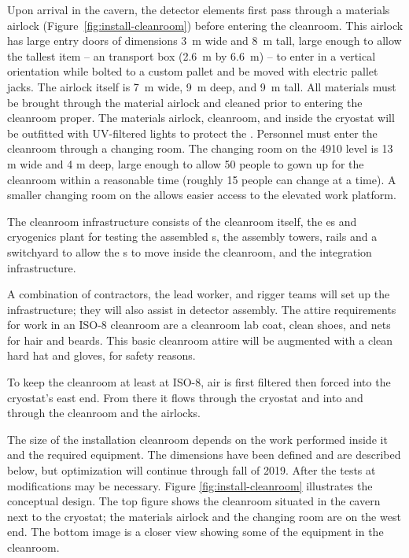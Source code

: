 Upon arrival in the cavern, the detector elements first pass through a materials airlock (Figure~\ref{fig:install-cleanroom}) before entering the cleanroom. This airlock has large entry doors of dimensions \SI{3}{m} wide and \SI{8}{m} tall, large enough to allow the tallest item -- an  transport box (\SI{2.6}{m} by \SI{6.6}{m}) -- to enter in a vertical orientation while bolted to a custom pallet and be moved with electric pallet jacks. 
The airlock itself is \SI{7}{m} wide, \SI{9}{m} deep, and \SI{9}{m} tall. All materials must be brought through the material airlock and cleaned prior to entering the cleanroom proper. 
The materials airlock, cleanroom, and inside the cryostat will be outfitted with UV-filtered lights to protect the . 
Personnel must enter the cleanroom through a changing room. The changing room on the 4910 level is 13 \si{m} wide and 4 \si{m} deep, %
large enough to allow 50 people to gown up for the cleanroom within a reasonable time (roughly 15 people can change at a time). A smaller changing room on the  allows easier access to the elevated work platform.


The cleanroom infrastructure consists of the cleanroom itself, the \coldbox{}es and cryogenics plant for testing the assembled s, the assembly towers, rails and a switchyard to allow the s to move inside the cleanroom, and the  integration infrastructure. 

A combination of contractors, the lead worker, and rigger teams will set up the infrastructure;  they will also assist in detector assembly. 
The attire requirements for work in an ISO-8 cleanroom are a cleanroom lab coat, clean shoes, and nets for hair and beards.  This basic cleanroom attire will be augmented with a clean hard hat and gloves, for safety reasons. 

To keep the cleanroom at least at ISO-8, air is first filtered then forced into the cryostat's east end. 
From there it flows through the cryostat and into and through the cleanroom and the airlocks. 


The size of the installation cleanroom depends on the work performed inside it and the required equipment. The dimensions have been defined and are described below, but optimization will continue through fall of 2019.
After the tests at  modifications may be necessary. 
Figure \ref{fig:install-cleanroom} illustrates  the conceptual design. The top figure shows the cleanroom situated in the cavern next to the cryostat; the materials airlock and the changing room are on the west end. The bottom image is a closer view showing some of the equipment in the cleanroom. 

